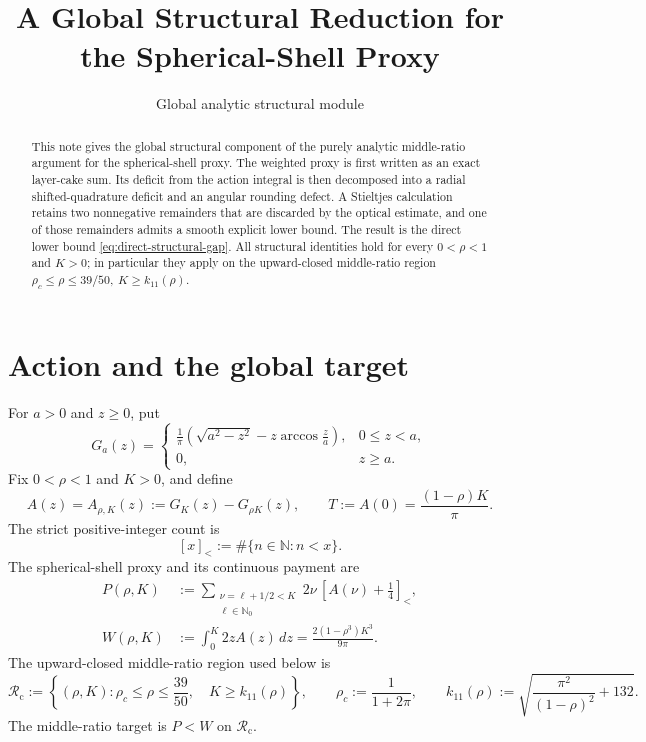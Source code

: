 \documentclass[11pt]{article}
\title{A Global Structural Reduction for the Spherical-Shell Proxy}
\author{}
\date{Global analytic structural module}
\theoremstyle{remark}
\newcommand{\N}{\mathbb N}
\newcommand{\strict}[1]{\left[#1\right]_{<}}
\begin{document}
\maketitle

\begin{abstract}
This note gives the global structural component of the purely analytic
middle-ratio argument for the spherical-shell proxy.  The weighted proxy is
first written as an exact layer-cake sum.  Its deficit from the action
integral is then decomposed into a radial shifted-quadrature deficit and an
angular rounding defect.  A Stieltjes calculation retains two nonnegative
remainders that are discarded by the optical estimate, and one of those
remainders admits a smooth explicit lower bound.  The result is the direct
lower bound \eqref{eq:direct-structural-gap}.  All structural identities
hold for every $0<\rho<1$ and $K>0$; in particular they apply on the
upward-closed
middle-ratio region
\(
 \rho_c\leq\rho\leq39/50,
 \ K\geq k_{11}(\rho)
\).
\end{abstract}

\section{Action and the global target}

For $a>0$ and $z\geq0$, put
\begin{equation}
 G_a(z)=
 \begin{cases}
 \displaystyle \frac1\pi\left(\sqrt{a^2-z^2}
       -z\arccos\frac za\right),&0\leq z<a,\\[4pt]
 0,&z\geq a.
 \end{cases}
 \label{eq:G-def}
\end{equation}
Fix $0<\rho<1$ and $K>0$, and define
\begin{equation}
 A(z)=A_{\rho,K}(z):=G_K(z)-G_{\rho K}(z),
 \qquad
 T:=A(0)=\frac{(1-\rho)K}{\pi}.
 \label{eq:A-def}
\end{equation}
The strict positive-integer count is
\[
 \strict{x}:=\#\{n\in\N:n<x\}.
\]
The spherical-shell proxy and its continuous payment are
\begin{align}
 P(\rho,K)
 &:=\sum_{\substack{\nu=\ell+1/2<K\\ \ell\in\mathbb N_0}}
       2\nu\,\strict{A(\nu)+\tfrac14},
 \label{eq:proxy-def}\\
 W(\rho,K)
 &:=\int_0^K2zA(z)\,dz
   =\frac{2(1-\rho^3)K^3}{9\pi}.
 \label{eq:W-def}
\end{align}
The upward-closed middle-ratio region used below is
\begin{equation}
 \mathcal R_{\mathrm c}:=
 \left\{(\rho,K):
 \rho_c\leq\rho\leq\frac{39}{50},\quad
 K\geq k_{11}(\rho)\right\},
 \qquad
 \rho_c:=\frac1{1+2\pi},
 \qquad
 k_{11}(\rho):=
 \sqrt{\frac{\pi^2}{(1-\rho)^2}+132}.
 \label{eq:compact-residual}
\end{equation}
The middle-ratio target is $P<W$ on $\mathcal R_{\mathrm c}$.
\end{document}
